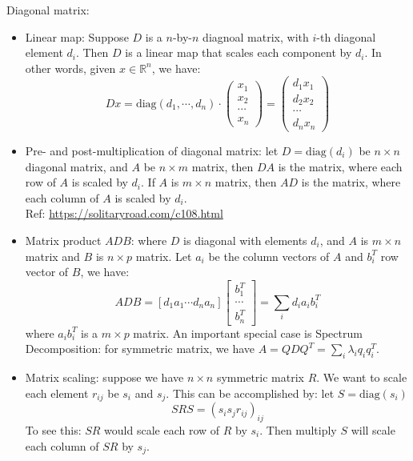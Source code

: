 \documentclass{report}
\begin{document}
Diagonal matrix: 
\begin{itemize}
	\item Linear map: Suppose $D$ is a $n$-by-$n$ diagnoal matrix, with $i$-th diagonal element $d_i$. Then $D$ is a linear map that scales each component by $d_i$. In other words, given $x \in \mathbb{R}^n$, we have: 
	\begin{equation}
	Dx = \text{diag}(d_1, \cdots, d_n) \cdot \left( \begin{array}{c} x_1 \\ x_2 \\ \cdots \\ x_n \end{array} \right)	= \left( \begin{array}{c} d_1 x_1 \\ d_2 x_2 \\ \cdots \\ d_n x_n \end{array} \right)
	\end{equation}
	
	\item Pre- and post-multiplication of diagonal matrix: let $D = \text{diag}(d_i)$ be $n \times n$ diagonal matrix, and $A$ be $n \times m$ matrix, then $DA$ is the matrix, where each row of $A$ is scaled by $d_i$. If $A$ is $m \times n$ matrix, then $AD$ is the matrix, where each column of $A$ is scaled by $d_i$. \\
	Ref: \url{https://solitaryroad.com/c108.html}
	
	\item Matrix product $A D B$: where $D$ is diagonal with elements $d_i$, and $A$ is $m \times n$ matrix and $B$ is $n \times p$ matrix. Let $a_i$ be the column vectors of $A$ and $b_i^T$ row vector of $B$, we have: 
	\begin{equation}
	A D B = [d_1 a_1 \cdots d_n a_n] \left[ \begin{array}{c}
	b_1^T \\
	\cdots \\
	b_n^T
	\end{array}
	\right]
	= \sum_i d_i a_i b_i^T
	\end{equation}
	where $a_i b_i^T$ is a $m \times p$ matrix. An important special case is Spectrum Decomposition: for symmetric matrix, we have $A = Q D Q^T = \sum_i \lambda_i q_i q_i^T$.
	
	\item Matrix scaling: suppose we have $n \times n$ symmetric matrix $R$. We want to scale each element $r_{ij}$ be $s_i$ and $s_j$. This can be accomplished by: let $S = \text{diag}(s_i)$ 
	\begin{equation}
	S R S = \left( s_i s_j r_{ij}\right)_{ij}
	\end{equation}
	To see this: $SR$ would scale each row of $R$ by $s_i$. Then multiply $S$ will scale each column of $SR$ by $s_j$. 
\end{itemize}
\end{document}
